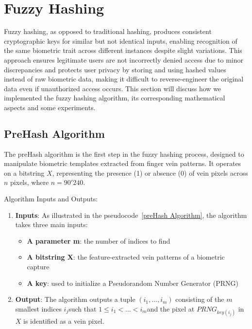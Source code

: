 


\section{Fuzzy Hashing}
\label{sec:Fuzzy Hashing}
Fuzzy hashing, as opposed to traditional hashing, produces consistent cryptographic keys for similar but not identical inputs, enabling recognition of the same biometric trait across different instances despite slight variations. This approach ensures legitimate users are not incorrectly denied access due to minor discrepancies and protects user privacy by storing and using hashed values instead of raw biometric data, making it difficult to reverse-engineer the original data even if unauthorized access occurs. 
This section will discuss how we implemented the fuzzy hashing algorithm, its corresponding mathematical aspects and some experiments.

\subsection{PreHash Algorithm}

The preHash algorithm is the first step in the fuzzy hashing process, designed to manipulate biometric templates extracted from finger vein patterns. It operates on a bitstring \(X\), representing the presence (1) or absence (0) of vein pixels across \(n\) pixels, where \(n=90'240\).

Algorithm Inputs and Outputs:
\begin{enumerate}
    \item \textbf{Inputs}: As illustrated in the pseudocode~\ref{preHash Algorithm}, the algorithm takes three main inputs:
    \begin{itemize}
        \item \textbf{A parameter m}: the number of indices to find
        \item \textbf{A bitstring X}: the feature-extracted vein patterns of a biometric capture
        \item \textbf{A key}: used to initialize a Pseudorandom Number Generator (PRNG)
    \end{itemize}
    \item \textbf{Output}: The algorithm outputs a tuple \((i_1,...,i_m)\) consisting of the \(m\) smallest indices \(i_j\)​ such that \(1 \leq i_1<...<i_m\)​ and the pixel at \(PRNG_{key(i_j)}\) in \(X\) is identified as a vein pixel. 
\end{enumerate}


